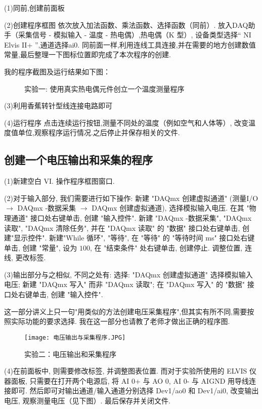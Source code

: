 \documentclass[11pt]{article}
\begin{document}
(1)同前,创建前面板 

(2)创建程序框图
依次放入加法函数、乘法函数、选择函数（同前）.
放入DAQ助手（采集信号 - 模拟输入 - 温度 - 热电偶）,热电偶（K 型）,
设备类型选择“ NI Elvis II+ ”,通道选择ai0.
同前面一样,利用连线工具连接,并在需要的地方创建数值常量,最后整理一下图标位置即完成了本次程序的创建.

我的程序截图及运行结果如下图：
\begin{figure}[htb]
    \centering
    \hspace{0.5cm}
    \caption{实验一: 使用真实热电偶元件创立一个温度测量程序}
\end{figure}


(3)利用香蕉转针型线连接电路即可

(4)运行程序
点击连续运行按钮,测量不同处的温度（例如空气和人体等）,
改变温度值单位,观察程序运行情况.之后停止并保存相关的文件.

\subsection{创建一个电压输出和采集的程序}

(1)新建空白 VI. 操作程序框图窗口.

(2)对于输入部分, 我们需要进行如下操作: 新建 "DAQmx 创建虚拟通道" 
(测量I/O $\to$ DAQmx -数据采集 $\to$ DAQmx 创建虚拟通道), 选择模拟输入电压. 
在其  "物理通道"  接口处右键单击, 创建 "输入控件". 新建 "DAQmx -数据采集", 
"DAQmx 读取", "DAQmx 清除任务", 并在 "DAQmx 读取" 的  "数据"  接口处右键单击, 
创建"显示控件". 新建"While 循环", "等待", 在 "等待" 的 "等待时间 ms" 接口处右键单击, 
创建 "常量", 设为 $100$, 在 "结束条件" 处右键单击, 创建停止. 调整位置, 连线, 更改标签.

(3)输出部分与之相似, 不同之处有: 选择:  "DAQmx 创建虚拟通道" 
选择模拟输入电压; 新建 "DAQmx 写入" 而非 "DAQmx 读取"; 
在 "DAQmx 写入" 的  "数据"  接口处右键单击, 创建 "输入控件".

这一部分讲义上只一句"用类似的方法创建电压采集程序",但其实有所不同,需要按照实际功能的要求选择.
我在这一部分也请教了老师才做出正确的程序图.
\begin{figure}[htbp]
    \centering
    \texttt{[image: 电压输出与采集程序.JPG]}
    \caption{实验二：电压输出和采集程序}
\end{figure}

(4)在前面板中, 则需要修改标签, 并调整图表位置. 
而对于实验所使用的 ELVIS 仪器面板, 只需要在打开两个电源后, 
将 AI 0+ 与 AO 0, AI 0- 与 AIGND 用导线连接即可. 
然后即可对输出通道/输入通道分别选择 Dev1/ao0 和 Dev1/ai0, 
改变输出电压, 观察测量电压（见下图）. 最后保存并关闭文件.
\end{document}
